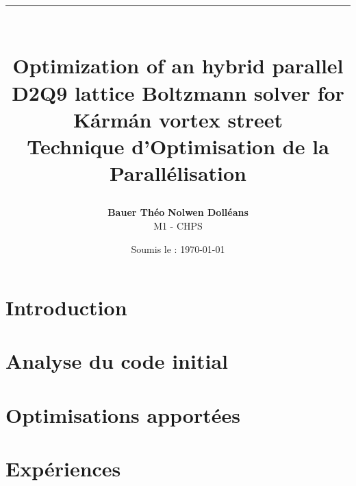 \documentclass[10pt, a4paper, twocolumn]{article}
\title{%
  \vspace{-1.5cm}
  \rule{\linewidth}{0.5pt} \\[0.5em]
  {\LARGE \textbf{Optimization of an hybrid parallel D2Q9 lattice Boltzmann solver for Kármán vortex street}} \\[0.2em]
  {\large Technique d'Optimisation de la Parallélisation}
}
\author{%
  \textbf{Bauer Théo} \quad
  \textbf{Nolwen Dolléans} \\[0.4em]
  \small M1 - CHPS \\
}
\date{%
  \small Soumis le : \today
}
\theoremstyle{definition}
\theoremstyle{remark}
\begin{document}
\twocolumn[
  \maketitle

    

  \rule{\linewidth}{1.5pt}
  \vspace{1em}
]

\section{Introduction}




\section{Analyse du code initial}



\section{Optimisations apportées}


\section{Expériences}

\end{document}
